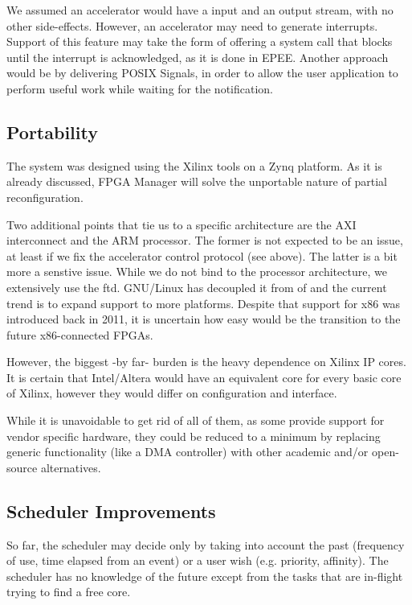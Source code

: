 We assumed an accelerator would have a input and an output stream, with no other side-effects.
However, an accelerator may need to generate interrupts. Support of this feature may take the form of
offering a system call that blocks until the interrupt is acknowledged, as it is done in EPEE\cite{epee}.
Another approach would be by delivering POSIX Signals, in order to allow the user application to perform
useful work while waiting for the notification.

\subsection{Portability}

The system was designed using the Xilinx tools on a Zynq platform. As it is already discussed, FPGA Manager will
solve the unportable nature of partial reconfiguration. 

Two additional points that tie us to a specific architecture are the AXI interconnect and the ARM processor.
The former is not expected to be an issue, at least if we fix the accelerator control protocol (see above).
The latter is a bit more a senstive issue. While we do not bind to the processor architecture, we extensively use
the \gls{ftd}. GNU/Linux has decoupled it from \gls{of} and the current trend is to expand support to more platforms.
Despite that support for x86 was introduced back in 2011, it is uncertain how easy would be the transition to
the future x86-connected FPGAs.

However, the biggest -by far- burden is the heavy dependence on Xilinx IP cores. It is certain that
Intel/Altera would have an equivalent core for every basic core of Xilinx, however they would differ on
configuration and interface.

While it is unavoidable to get rid of all of them, as some provide support for vendor specific hardware,
they could be reduced to a minimum by replacing generic functionality (like a DMA controller) with
other academic and/or open-source alternatives.

\subsection{Scheduler Improvements}

So far, the scheduler may decide only by taking into account the past (frequency of use, time elapsed from an event)
or a user wish (e.g. priority, affinity). The scheduler has no knowledge of the future except from
the tasks that are in-flight trying to find a free core.

